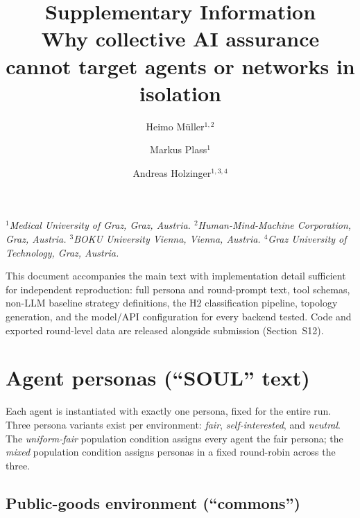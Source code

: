 \documentclass[11pt,a4paper]{article}
\title{\bfseries Supplementary Information\\
\large Why collective AI assurance cannot target agents or networks in
isolation}
\author{Heimo M\"uller$^{1,2}$ \and Markus Plass$^{1}$ \and
Andreas Holzinger$^{1,3,4}$}
\date{}
\begin{document}
\maketitle

\noindent\textit{$^{1}$Medical University of Graz, Graz, Austria.
$^{2}$Human-Mind-Machine Corporation, Graz, Austria.
$^{3}$BOKU University Vienna, Vienna, Austria.
$^{4}$Graz University of Technology, Graz, Austria.}
\vspace{1em}

This document accompanies the main text with implementation detail
sufficient for independent reproduction: full persona and round-prompt
text, tool schemas, non-LLM baseline strategy definitions, the H2
classification pipeline, topology generation, and the model/API
configuration for every backend tested. Code and exported round-level
data are released alongside submission (Section~S12).

\section{Agent personas (``SOUL'' text)}
\label{sec:s1}

Each agent is instantiated with exactly one persona, fixed for the
entire run. Three persona variants exist per environment: \emph{fair},
\emph{self-interested}, and \emph{neutral}. The \emph{uniform-fair}
population condition assigns every agent the fair persona; the
\emph{mixed} population condition assigns personas in a fixed
round-robin across the three.

\subsection{Public-goods environment (``commons'')}
\end{document}
